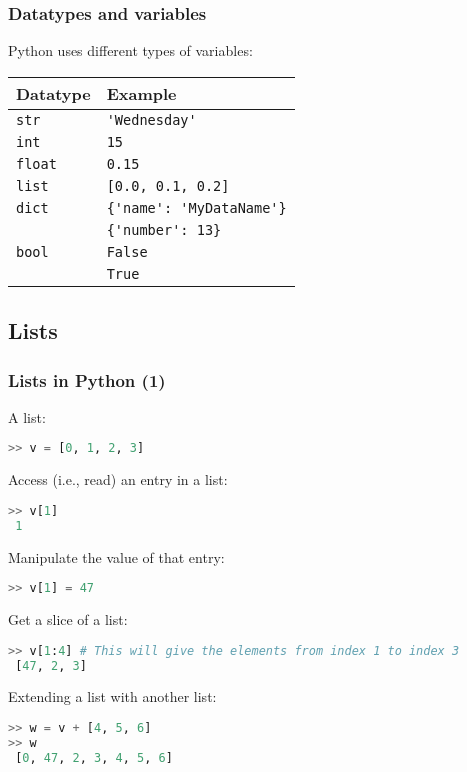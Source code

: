 \begin{frame}[fragile]
  \frametitle{Datatypes and variables}
  Python uses different types of variables:
      \begin{longtable}{l!{\vrule}l}
       Datatype        & Example \\ \hline
       \texttt{str}    & \lstinline$'Wednesday'$ \\
       \texttt{int}    & \lstinline$15$ \\
       \texttt{float}  & \lstinline$0.15$ \\
       \texttt{list}   & \lstinline$[0.0, 0.1, 0.2]$ \\
       \texttt{dict}   & \lstinline${'name': 'MyDataName'}$ \\
                       & \lstinline${'number': 13}$ \\
       \texttt{bool}   & \lstinline$False$ \\
                       & \lstinline$True$ \\
     \end{longtable}
 \end{frame}


 \subsection*{Lists}
 \begin{frame}[fragile]
   \frametitle{Lists in Python (1)}
   A list:
   \begin{lstlisting}[language=Python]
>> v = [0, 1, 2, 3]
   \end{lstlisting}\pause
   Access (i.e., read) an entry in a list:
   \begin{lstlisting}[language=Python]
>> v[1]
 1
   \end{lstlisting}\pause
   Manipulate the value of that entry:
   \begin{lstlisting}[language=Python]
>> v[1] = 47
   \end{lstlisting}\pause
   Get a slice of a list:
   \begin{lstlisting}[language=Python]
>> v[1:4] # This will give the elements from index 1 to index 3
 [47, 2, 3]
   \end{lstlisting}\pause
   Extending a list with another list:
   \begin{lstlisting}[language=Python]
>> w = v + [4, 5, 6]
>> w
 [0, 47, 2, 3, 4, 5, 6]
   \end{lstlisting}
 \end{frame}
 
